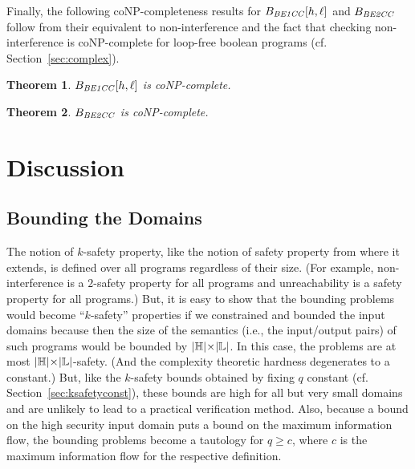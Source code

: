 \documentclass{llncs}
\newtheorem{theorem}{Theorem}[section]
\begin{document}
\begin{sloppypar}
Finally, the following coNP-completeness results for $B_{\it
  BE1CC}[h,\ell]$ and $B_{\it BE2CC}$ follow from their equivalent to
non-interference and the fact that checking non-interference is
coNP-complete for loop-free boolean programs
(cf. Section~\ref{sec:complex}).
\end{sloppypar}
\begin{theorem}
\label{thm:conpbe3}
$B_{\it BE1CC}[h,\ell]$ is coNP-complete.
\end{theorem}

\begin{theorem}
\label{thm:conpbe4}
$B_{\it BE2CC}$ is coNP-complete.
\end{theorem}

\section{Discussion}

\label{sec:discussion}

\subsection{Bounding the Domains}

The notion of $k$-safety property, like the notion of safety property
from where it extends, is defined over all programs regardless of
their size.  (For example, non-interference is a $2$-safety property
for all programs and unreachability is a safety property for all
programs.)  But, it is easy to show that the bounding problems would
become ``$k$-safety'' properties if we constrained and bounded the
input domains because then the size of the semantics (i.e., the
input/output pairs) of such programs would be bounded by
$|\mathbb{H}|\hspace{-0.2em}\times\hspace{-0.2em}|\mathbb{L}|$.  In
this case, the problems are at most
$|\mathbb{H}|\hspace{-0.2em}\times\hspace{-0.2em}|\mathbb{L}|$-safety.
(And the complexity theoretic hardness degenerates to a constant.)
But, like the $k$-safety bounds obtained by fixing $q$ constant
(cf. Section~\ref{sec:ksafetyconst}), these bounds are high for all
but very small domains and are unlikely to lead to a practical
verification method.  Also, because a bound on the high security input
domain puts a bound on the maximum information flow, the bounding
problems become a tautology for $q \geq c$, where $c$ is the maximum
information flow for the respective definition.
\end{document}
